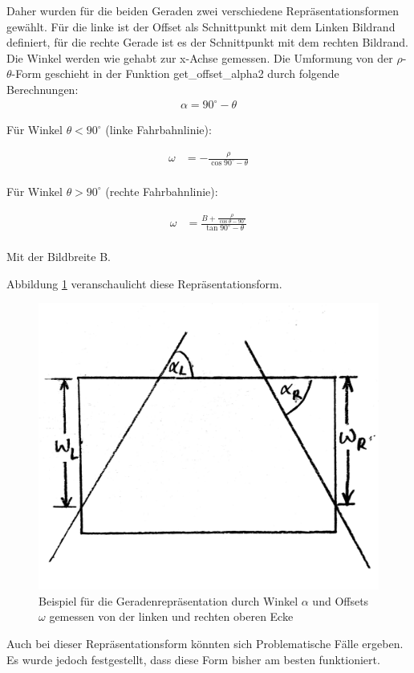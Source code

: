 	Daher wurden für die beiden Geraden zwei verschiedene Repräsentationsformen gewählt. Für die linke ist der Offset als Schnittpunkt mit dem Linken Bildrand definiert, für die rechte Gerade ist es der Schnittpunkt mit dem rechten Bildrand. Die Winkel werden wie gehabt zur x-Achse gemessen. Die Umformung von der $\rho$-$\theta$-Form geschieht in der Funktion get\_offset\_alpha2 durch folgende Berechnungen: \\
	
	\begin{align*}
	\alpha=90^{\circ}-\theta
	\end{align*}
	
	
	Für Winkel $\theta<90^\circ$ (linke Fahrbahnlinie):
	
	\begin{align*}
	\omega&=-\frac{\rho}{\cos{90^{\circ}-\theta}} \\
	\end{align*}
	
	Für Winkel $\theta>90^\circ$ (rechte Fahrbahnlinie):
	
	\begin{align*}
	\omega&=\frac{B+\frac{\rho}{\cos{\theta-90^{\circ}}}}{\tan{90^{\circ}-\theta}} \\
	\end{align*}
	
	Mit der Bildbreite B.
	
	Abbildung \ref{fig:alpha_omega3} veranschaulicht diese Repräsentationsform.
	
	\begin{figure}[H]
		\centering
		\includegraphics[width=.5\linewidth]{images/alpha_omega3.jpg}
		\caption{Beispiel für die Geradenrepräsentation durch Winkel $\alpha$ und Offsets $\omega$ gemessen von der linken und rechten oberen Ecke}
		\label{fig:alpha_omega3}
	\end{figure}


	Auch bei dieser Repräsentationsform könnten sich Problematische Fälle ergeben. Es wurde jedoch festgestellt, dass diese Form bisher am besten funktioniert.\\
	
